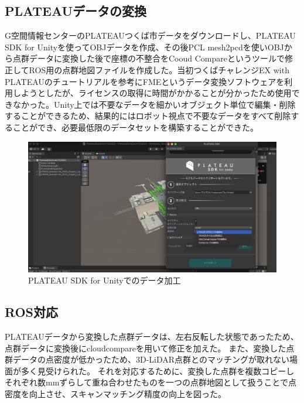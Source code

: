 \documentclass[platex,dvipdfmx]{rbproceedings}
\begin{document}
\subsection{PLATEAUデータの変換}
G空間情報センターのPLATEAUつくば市データ\cite{pltsukuba}をダウンロードし、PLATEAU SDK for Unity\cite{plateau_unity}を使ってOBJデータを作成、その後PCL mesh2pcd\cite{pcl_mesh2pcd}を使いOBJから点群データに変換した後で座標の不整合をCooud Compareというツールで修正してROS用の点群地図ファイルを作成した。当初つくばチャレンジEX with PLATEAUのチュートリアル\cite{tcexpl}を参考にFMEというデータ変換ソフトウェアを利用しようとしたが、ライセンスの取得に時間がかかることが分かったため使用できなかった。Unity上では不要なデータを細かいオブジェクト単位で編集・削除することができるため、結果的にはロボット視点で不要なデータをすべて削除することができ、必要最低限のデータセットを構築することができた。
\begin{figure}
    \centering
    \includegraphics[width=0.8\linewidth]{picture/plateau_unity.png}
    \caption{PLATEAU SDK for Unityでのデータ加工}
    \label{fig:plateau_unity}
\end{figure}

\subsection{ROS対応}
PLATEAUデータから変換した点群データは、左右反転した状態であったため、点群データに変換後にcloudcompareを用いて修正を加えた。
また、変換した点群データの点密度が低かったため、3D-LiDAR点群とのマッチングが取れない場面が多く見受けられた。
それを対応するために、変換した点群を複数コピーしそれぞれ数mmずらして重ね合わせたものを一つの点群地図として扱うことで点密度を向上させ、スキャンマッチング精度の向上を図った。
\end{document}
